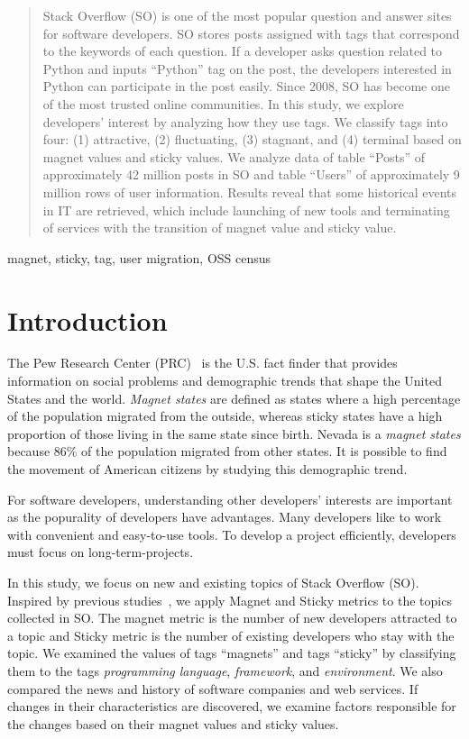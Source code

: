 \documentclass[conference]{IEEEtran}
\begin{document}
\begin{abstract}
Stack Overflow (SO) is one of the most popular question and answer sites for software developers. SO stores posts assigned with tags that correspond to the keywords of each question. If a developer asks question related to Python and inputs ``Python'' tag on the post, the developers interested in Python can participate in the post easily. Since 2008, SO has become one of the most trusted online communities. In this study, we explore developers' interest by analyzing how they use tags. We classify tags into four: (1) attractive, (2) fluctuating, (3) stagnant, and (4) terminal based on magnet values and sticky values. We analyze data of table ``Posts'' of approximately 42 million posts in SO and table ``Users'' of approximately 9 million rows of user information. Results reveal that some historical events in IT are retrieved, which include launching of new tools and terminating of services with the transition of magnet value and sticky value.
\end{abstract}

\begin{IEEEkeywords}
magnet, sticky, tag, user migration, OSS census
\end{IEEEkeywords}

\section{Introduction}
The Pew Research Center (PRC)~\cite{communityeconomic} is the U.S. fact finder that provides information on social problems and demographic trends that shape the United States and the world. \emph{Magnet states} are defined as states where a high percentage of the population migrated from the outside, whereas sticky states have a high proportion of those living in the same state since birth. Nevada is a \emph{magnet states} because  86\% of the population migrated from other states. It is possible to find the movement of American citizens by studying this demographic trend.

For software developers, understanding other developers' interests are important as the popurality of developers have advantages. Many developers like to work with convenient and easy-to-use tools. To develop a project efficiently, developers must focus on long-term-projects. 

In this study, we focus on new and existing topics of Stack Overflow (SO). Inspired by previous studies~\cite{yamashita2016magnet}, we apply Magnet and Sticky metrics to the topics collected in SO. 
The magnet metric is the number of new developers attracted to a topic and Sticky metric is the number of existing developers who stay with the topic. 
We examined the values of tags ``magnets'' and tags ``sticky'' by classifying them to the tags \emph{programming language}, \emph{framework}, and \emph{environment}. We also compared the news and history of software  companies and web services. If changes in their characteristics are discovered, we examine factors responsible for the changes based on their magnet values and sticky values. 
\end{document}
